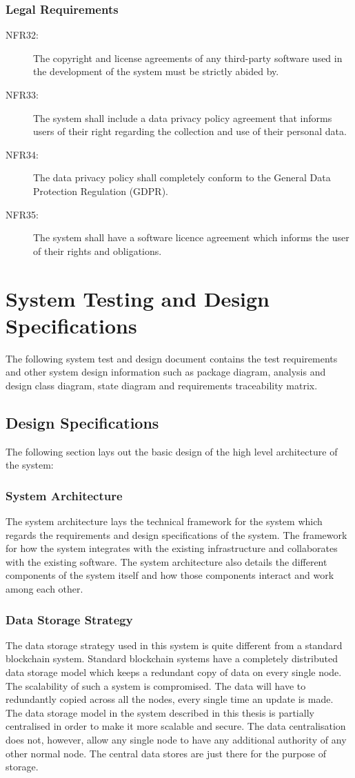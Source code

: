 \documentclass[a4paper,twoside,phd]{BYUPhys}
\begin{document}
\subsection{Legal Requirements}
\begin{description}
\item[NFR32:] The copyright and license agreements of any third-party software used in the development of the system must be strictly abided by.
\item[NFR33:] The system shall include a data privacy policy agreement that informs users of their right regarding the collection and use of their personal data.
\item[NFR34:] The data privacy policy shall completely conform to the General Data Protection Regulation (GDPR).
\item[NFR35:] The system shall have a software licence agreement which informs the user of their rights and obligations.

\end{description}
\chapter{System Testing and Design Specifications}
The following system test and design document contains the test requirements and other system design information such as package diagram, analysis and design class diagram, state diagram and requirements traceability matrix.  
\section{Design Specifications}
The following section lays out the basic design of the high level architecture of the system:
\subsection{System Architecture}
The system architecture lays the technical framework for the system which regards the requirements and design specifications of the system. The framework for how the system integrates with the existing infrastructure and collaborates with the existing software. The system architecture also details the different components of the system itself and how those components interact and work among each other.
\subsection{Data Storage Strategy}
The data storage strategy used in this system is quite different from a standard blockchain system. Standard blockchain systems have a completely distributed data storage model which keeps a redundant copy of data on every single node. The scalability of such a system is compromised. The data will have to redundantly copied across all the nodes, every single time an update is made. The data storage model in the system described in this thesis is partially centralised in order to make it more scalable and secure. The data centralisation does not, however, allow any single node to have any additional authority of any other normal node. The central data stores are just there for the purpose of storage. 
\end{document}
